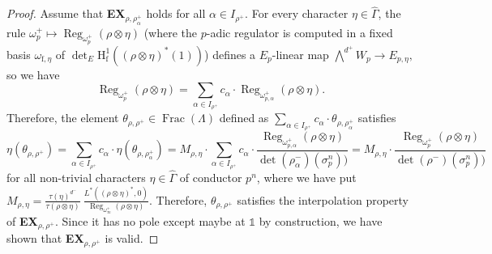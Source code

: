 \documentclass[10pt,a4paper]{amsart}
\DeclareMathOperator{\Frac}{Frac}
\newcommand{\HH}{\mathrm{H}}
\DeclareMathOperator{\Reg}{Reg}
\newcommand{\ff}{\mathrm{f}}
\begin{document}
\begin{proof}
	Assume that \textbf{EX}$_{\rho,\rho^+_\alpha}$ holds for all $\alpha\in I_{\rho^+}$. For every character $\eta\in\widehat{\Gamma}$, the rule $\omega_p^+ \mapsto \Reg_{\omega_p^+}(\rho\otimes\eta)$ (where the $p$-adic regulator is computed in a fixed basis $\omega_{\ff,\eta}$ of $\det_E \HH^1_\ff((\rho\otimes\eta)^*(1))$) defines a $E_{p}$-linear map 
	${\bigwedge}^{d^+} W_p \longrightarrow E_{p,\eta},$ so we have $$\Reg_{\omega_p^+}(\rho\otimes\eta)=\sum_{\alpha \in I_{\rho^+}} c_\alpha\cdot \Reg_{\omega^+_{p,\alpha}}(\rho\otimes\eta).$$ Therefore, the element $\theta_{\rho,\rho^+}\in\Frac(\Lambda)$ defined as $\sum_{\alpha \in I_{\rho^+}}c_\alpha\cdot \theta_{\rho,\rho^+_\alpha}$ satisfies
	\[\eta(\theta_{\rho,\rho^+}) = \sum_{\alpha \in I_{\rho^+}}c_\alpha\cdot \eta(\theta_{\rho,\rho^+_\alpha}) =M_{\rho,\eta} \cdot \sum_{\alpha \in I_{\rho^+}}c_\alpha\cdot \frac{\Reg_{\omega^+_{p,\alpha}}(\rho\otimes\eta)}{\det(\rho_\alpha^-)(\sigma_p^n))} =M_{\rho,\eta} \cdot \frac{\Reg_{\omega^+_{p}}(\rho\otimes\eta)}{\det(\rho^-)(\sigma_p^n))}\]
	for all non-trivial characters $\eta\in\widehat{\Gamma}$ of conductor $p^n$, where we have put $M_{\rho,\eta}=\frac{\tau(\eta)^{d^-}}{\tau(\rho\otimes\eta)}\ \frac{L^{*}\left((\rho \otimes \eta)^*,0\right)}{\Reg_{\omega_\infty^+}(\rho\otimes\eta)}$. Therefore, $\theta_{\rho,\rho^+}$ satisfies the interpolation property of \textbf{EX}$_{\rho,\rho^+}$. Since it has no pole except maybe at $\mathds{1}$ by construction, we have shown that \textbf{EX}$_{\rho,\rho^+}$ is valid.
\end{proof}
\end{document}
